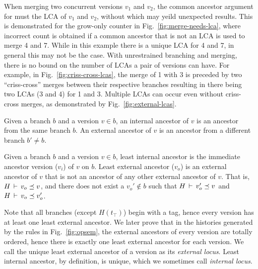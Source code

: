 When merging two concurrent versions $v_1$ and $v_2$, the common
ancestor argument for  must the LCA of $v_1$ and $v_2$,
without which  may yeild unexpected results. This is
demonstrated for the grow-only counter in
Fig.~\ref{fig:merge-needs-lca}, where incorrect count is obtained if a
common ancestor that is not an LCA is used to merge 4 and 7. While in
this example there is a unique LCA for 4 and 7, in general this may
not be the case. With unrestrained branching and merging, there is no
bound on the number of LCAs a pair of versions can have.
For example, in
Fig.~\ref{fig:criss-cross-lcas}, the merge of 1 with 3 is preceded by
two ``criss-cross'' merges between their respective branches resulting
in there being two LCAs (3 and 4) for 1 and 3. Multiple LCAs can
occur even without criss-cross merges, as demonstrated by
Fig.~\ref{fig:external-lcas}. 

\begin{definition} 
Given a branch $b$ and a version $v\in b$, an internal ancestor of $v$
is an ancestor from the same branch $b$. An external ancestor of $v$
is an ancestor from a different branch $b'\neq b$. 
\end{definition}

\begin{definition} 
Given a branch $b$ and a version $v\in b$, least internal ancestor is
the immediate ancestor version ($v_i$) of $v$ on $b$. Least external
ancestor ($v_o$) is an external ancestor of $v$ that is not an
ancestor of any other external ancestor of $v$. That is,
$H\,\vdash\,v_o \preceq v$, and there does not exist a $v_o' \not\in
b$ such that $H\,\vdash\,v_o' \preceq v$ and $H\,\vdash\,v_o \preceq
v_o'$. 
\end{definition}

Note that all branches (except $H(t_{\top})$) begin with a 
tag, hence every version has at least one least external ancestor. We
later prove that in the histories generated by the rules in
Fig.~\ref{fig:opsem}, the external ancestors of every version are
totally ordered, hence there is exactly one least external ancestor
for each version. We call the unique least external ancestor of a
version as its \emph{external locus}. Least internal ancestor, by
definition, is unique, which we sometimes call \emph{internal locus}.

